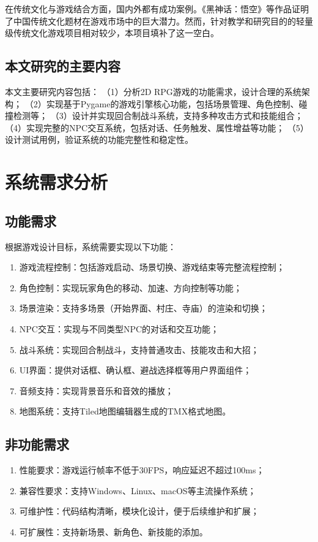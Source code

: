 \documentclass[a4paper,12pt]{article}
\begin{document}
在传统文化与游戏结合方面，国内外都有成功案例。《黑神话：悟空》等作品证明了中国传统文化题材在游戏市场中的巨大潜力。然而，针对教学和研究目的的轻量级传统文化游戏项目相对较少，本项目填补了这一空白。

\subsection{本文研究的主要内容}
本文主要研究内容包括：
（1）分析2D RPG游戏的功能需求，设计合理的系统架构；
（2）实现基于Pygame的游戏引擎核心功能，包括场景管理、角色控制、碰撞检测等；
（3）设计并实现回合制战斗系统，支持多种攻击方式和技能组合；
（4）实现完整的NPC交互系统，包括对话、任务触发、属性增益等功能；
（5）设计测试用例，验证系统的功能完整性和稳定性。

\section{系统需求分析}

\subsection{功能需求}
根据游戏设计目标，系统需要实现以下功能：
\begin{enumerate}[label=(\arabic*)]
\item 游戏流程控制：包括游戏启动、场景切换、游戏结束等完整流程控制；
\item 角色控制：实现玩家角色的移动、加速、方向控制等功能；
\item 场景渲染：支持多场景（开始界面、村庄、寺庙）的渲染和切换；
\item NPC交互：实现与不同类型NPC的对话和交互功能；
\item 战斗系统：实现回合制战斗，支持普通攻击、技能攻击和大招；
\item UI界面：提供对话框、确认框、避战选择框等用户界面组件；
\item 音频支持：实现背景音乐和音效的播放；
\item 地图系统：支持Tiled地图编辑器生成的TMX格式地图。
\end{enumerate}

\subsection{非功能需求}
\begin{enumerate}[label=(\arabic*)]
\item 性能要求：游戏运行帧率不低于30FPS，响应延迟不超过100ms；
\item 兼容性要求：支持Windows、Linux、macOS等主流操作系统；
\item 可维护性：代码结构清晰，模块化设计，便于后续维护和扩展；
\item 可扩展性：支持新场景、新角色、新技能的添加。
\end{enumerate}
\end{document}
